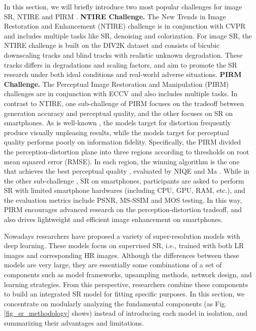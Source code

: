 In this section, we will briefly introduce two most popular challenges for image SR, NTIRE  and PIRM .
\textbf{NTIRE Challenge.}
The New Trends in Image Restoration and Enhancement (NTIRE) challenge  is in conjunction with CVPR and includes multiple tasks like SR, denoising and colorization.
For image SR, the NTIRE challenge is built on the DIV2K  dataset and consists of bicubic downscaling tracks and blind tracks with realistic unknown degradation.
These tracks differs in degradations and scaling factors, and aim to promote the SR research under both ideal conditions and real-world adverse situations.
\textbf{PIRM Challenge.}
The Perceptual Image Restoration and Manipulation (PIRM) challenges are in conjunction with ECCV and also includes multiple tasks.
In contrast to NTIRE, one sub-challenge  of PIRM focuses on the tradeoff between generation accuracy and perceptual quality, and the other  focuses on SR on smartphones.
As is well-known , the models target for distortion frequently produce visually unpleasing results, while the models target for perceptual quality performs poorly on information fidelity.
Specifically, the PIRM divided the perception-distortion plane into three regions according to thresholds on root mean squared error (RMSE).
In each region, the winning algorithm is the one that achieves the best perceptual quality , evaluated by NIQE  and Ma .
While in the other sub-challenge , SR on smartphones, participants are asked to perform SR with limited smartphone hardwares (including CPU, GPU, RAM, etc.), and the evaluation metrics include PSNR, MS-SSIM and MOS testing.
In this way, PIRM encourages advanced research on the perception-distortion tradeoff, and also drives lightweight and efficient image enhancement on smartphones.

Nowadays researchers have proposed a variety of super-resolution models with deep learning.
These models focus on supervised SR, i.e., trained with both LR images and corresponding HR images.
Although the differences between these models are very large, they are essentially some combinations of a set of components such as model frameworks, upsampling methods, network design, and learning strategies.
From this perspective, researchers combine these components to build an integrated SR model for fitting specific purposes.
In this section, we concentrate on modularly analyzing the fundamental components (as Fig. \ref{fig_sr_methodology} shows) instead of introducing each model in isolation, and summarizing their advantages and limitations.

